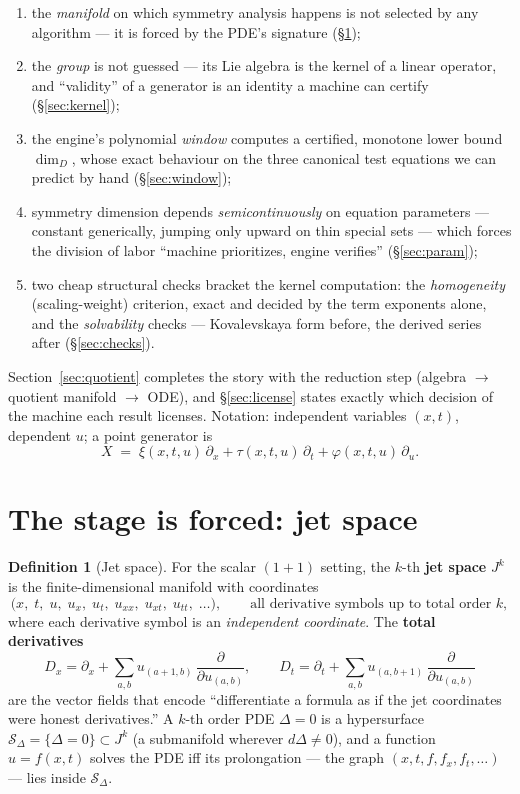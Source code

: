 \documentclass[11pt]{article}
\theoremstyle{plain}
\theoremstyle{definition}
\newtheorem{definition}[theorem]{Definition}
\theoremstyle{remark}
\newcommand{\Dx}{D_x}
\newcommand{\Dt}{D_t}
\begin{document}
\begin{enumerate}[nosep]
\item[(A)] the \emph{manifold} on which symmetry analysis happens is not selected by any algorithm
  --- it is forced by the PDE's signature (\S\ref{sec:stage});
\item[(B)] the \emph{group} is not guessed --- its Lie algebra is the kernel of a linear operator,
  and ``validity'' of a generator is an identity a machine can certify (\S\ref{sec:kernel});
\item[(C)] the engine's polynomial \emph{window} computes a certified, monotone lower bound
  $\dim_D$, whose exact behaviour on the three canonical test equations we can predict by hand
  (\S\ref{sec:window});
\item[(D)] symmetry dimension depends \emph{semicontinuously} on equation parameters --- constant
  generically, jumping only upward on thin special sets --- which forces the division of labor
  ``machine prioritizes, engine verifies'' (\S\ref{sec:param});
\item[(E)] two cheap structural checks bracket the kernel computation: the \emph{homogeneity}
  (scaling-weight) criterion, exact and decided by the term exponents alone, and the
  \emph{solvability} checks --- Kovalevskaya form before, the derived series after
  (\S\ref{sec:checks}).
\end{enumerate}

Section~\ref{sec:quotient} completes the story with the reduction step (algebra $\to$ quotient
manifold $\to$ ODE), and \S\ref{sec:license} states exactly which decision of the machine each
result licenses. Notation: independent variables $(x,t)$, dependent $u$; a point generator is
\[
X \;=\; \xi(x,t,u)\,\partial_x + \tau(x,t,u)\,\partial_t + \varphi(x,t,u)\,\partial_u .
\]

\section{The stage is forced: jet space}\label{sec:stage}

\begin{definition}[Jet space]
For the scalar $(1{+}1)$ setting, the $k$-th \textbf{jet space} $J^k$ is the finite-dimensional
manifold with coordinates
\[
\big(x,\;t,\;u,\;u_x,\;u_t,\;u_{xx},\;u_{xt},\;u_{tt},\;\dots\big),
\qquad\text{all derivative symbols up to total order } k,
\]
where each derivative symbol is an \emph{independent coordinate}. The \textbf{total derivatives}
\[
\Dx=\partial_x+\sum_{a,b} u_{(a+1,b)}\,\frac{\partial}{\partial u_{(a,b)}},
\qquad
\Dt=\partial_t+\sum_{a,b} u_{(a,b+1)}\,\frac{\partial}{\partial u_{(a,b)}}
\]
are the vector fields that encode ``differentiate a formula as if the jet coordinates were honest
derivatives.'' A $k$-th order PDE $\Delta=0$ is a hypersurface
$\mathcal S_\Delta=\{\Delta=0\}\subset J^k$ (a submanifold wherever $d\Delta\neq0$), and a function
$u=f(x,t)$ solves the PDE iff its prolongation --- the graph
$(x,t,f,f_x,f_t,\dots)$ --- lies inside $\mathcal S_\Delta$.
\end{definition}
\end{document}
